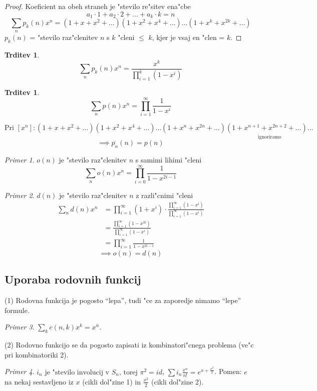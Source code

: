 \documentclass[a4paper,12pt]{article}
\theoremstyle{definition}
\newtheorem{claim}[counter]{Trditev}
\theoremstyle{remark}
\newtheorem*{ex}{Primer}
\begin{document}
\begin{proof}
	Koeficient na obeh straneh je "stevilo re"sitev ena"cbe
	\[a_1 \cdot 1 + a_2 \cdot 2 + \ldots + a_k \cdot k = n\]
	\[\sum_n p_k (n) x^n =  (1 + x + x^2 + \ldots) (1 + x^2+ x^4 + \ldots) \ldots (1 + x^k+ x^{2k} + \ldots)\]
	$p_k (n)$ = "stevilo raz"clenitev $n$ s $k$ "cleni $\leqslant$ $k$, kjer je vsaj en "clen = $k$.
\end{proof}

\begin{claim}
	\[\sum_n p_k(n) x^n = \frac{x^k}{\prod_{i = 1}^k (1 - x^i)}\]
\end{claim}

\begin{claim}
	\[\sum_n p(n) x^n = \prod_{i = 1}^{\infty} \frac{1}{1 - x^i}\]
\end{claim}

\[\text{Pri } [x^n]: (1 + x + x^2 + \ldots) (1 + x^2 + x^4 + \ldots) \ldots (1 + x^n + x^{2n} + \ldots)\underset{\text{ignoriramo}}{(1 + x^{n + 1} + x^{2n + 2} + \ldots) \ldots}\]
\[\implies \overline{p_n}(n) = p(n)\]

\begin{ex}
	$o(n)$ je "stevilo raz"clenitev $n$ s samimi lihimi "cleni
	\[\sum_n o(n) x^n = \prod_{i = 0}^{\infty} \frac{1}{1 - x^{2 i - 1}}\]
\end{ex}
\begin{ex}
	$d(n)$ je "stevilo raz"clenitev $n$ z razli"cnimi "cleni
	\begin{align*}
		\sum_n d(n) x^n &= \prod_{i = 1}^{\infty} (1 + x^i) \cdot \frac{\prod_{i = 1}^{\infty} (1 - x^i)}{\prod_{i = 1}^{\infty} (1 - x^i)}\\
		&= \frac{\prod_{i = 1}^{\infty} (1 - x^{2i})}{\prod_{i = 1}^{\infty} (1 - x^i)}\\
		&= \prod_{i = 1}^{\infty} \frac{1}{1 - x^{2i - 1}}
	\end{align*}
	\[\implies o(n) = d(n)\]
\end{ex}


\label{TODO: to sm malo spustu}
\subsection{Uporaba rodovnih funkcij}

(1) Rodovna funkcija je pogosto ``lepa'', tudi "ce za zaporedje nimamo ``lepe'' formule.
\begin{ex}
	$\sum_k c(n,k)x^k = x^{\overline{n}}$.
\end{ex}
(2) Rodovno funkcijo se da pogosto zapisati iz kombinatori"cnega problema (ve"c pri kombinatoriki 2).
\begin{ex}
	$i_n \text{ je "stevilo involucij v } S_n \text{, torej } \pi^2 = id$, $\sum i_n \frac{x^n}{n!} = e^{x+\frac{x^2}{2}}$.
	Pomen: $e$ na nekaj sestavljeno iz $x$ (cikli dol"zine 1) in $\frac{x^2}{2}$ (cikli dol"zine 2).
\end{ex}
\end{document}
